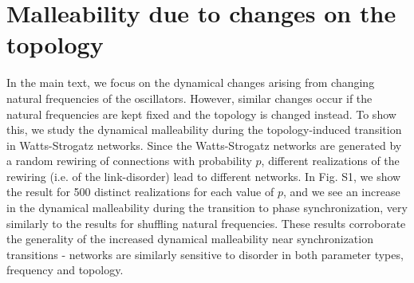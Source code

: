 \documentclass[reprint,onecolumn,superscriptaddress,showpacs,amsmath,amssymb,aps,prx,floatfix,]{revtex4-2}
\newcommand*{\meanR}{\ensuremath{R}}
\begin{document}


\section{Malleability due to changes on the topology}
In the main text, we focus on the dynamical changes arising from changing natural frequencies of the oscillators. However, similar changes occur if the natural frequencies are kept fixed and the topology is changed instead. To show this, we study the dynamical malleability during the topology-induced transition in Watts-Strogatz networks. Since the Watts-Strogatz networks are generated by a random rewiring of connections with probability $p$, different realizations of the rewiring (i.e. of the link-disorder) lead to different networks. In Fig. S1, we show the result for 500 distinct realizations for each value of $p$, and we see an increase in the dynamical malleability during the transition to phase synchronization, very similarly to the results for shuffling natural frequencies. These results corroborate the generality of the increased dynamical malleability near synchronization transitions - networks are similarly sensitive to disorder in both parameter types, frequency and topology.
\end{document}
